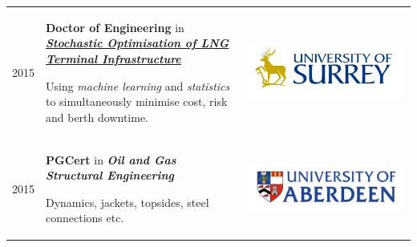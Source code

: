 \documentclass[letterpaper]{twentysecondcv} %
\begin{document}
\renewcommand{\arraystretch}{0.5}
\begin{table}[ht]
\centering
\begin{tabular}{p{} p{} m{}}
2015 & \textbf{Doctor of Engineering} in \href{http://epubs.surrey.ac.uk/812133/1/Rustell.\%20M.\%20Thesis\%202016.pdf}{\textbf{\textit{Stochastic Optimisation of LNG Terminal Infrastructure}}} 

Using \textit{machine learning} and \textit{statistics} to simultaneously minimise cost, risk and berth downtime.

& \href{http://www.surrey.ac.uk}{\includegraphics[width = 0.9\linewidth]{Figures/surreylogo.png}}\\

2015 & \textbf{PGCert} in \textbf{\textit{Oil and Gas Structural Engineering}} 

Dynamics, jackets, topsides, steel connections etc.

& \href{https://www.abdn.ac.uk/study/postgraduate-taught/degree-programmes/217/oil-and-gas-structural-engineering/}{\includegraphics[width = 0.9\linewidth]{Figures/aberdeen-university-logo.jpg}}\\


\end{tabular}
\end{table}
\end{document}
